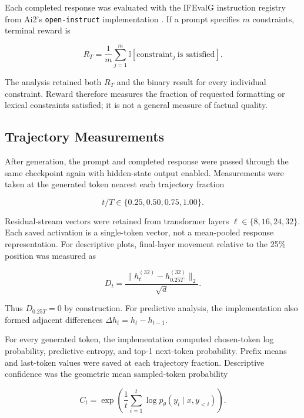 \documentclass[manuscript,screen,nonacm]{acmart}
\begin{document}
Each completed response was evaluated with the IFEvalG instruction registry
from Ai2's \texttt{open-instruct} implementation \citep{openinstruct}. If a
prompt specifies $m$ constraints, terminal reward is

\begin{equation}
R_T=\frac{1}{m}\sum_{j=1}^{m}
\mathbb{I}[\text{constraint}_j\ \text{is satisfied}].
\end{equation}

The analysis retained both $R_T$ and the binary result for every individual
constraint. Reward therefore measures the fraction of requested formatting or
lexical constraints satisfied; it is not a general measure of factual quality.

\subsection{Trajectory Measurements}

After generation, the prompt and completed response were passed through the
same checkpoint again with hidden-state output enabled. Measurements were
taken at the generated token nearest each trajectory fraction

\begin{equation}
t/T\in\{0.25,0.50,0.75,1.00\}.
\end{equation}

Residual-stream vectors were retained from transformer layers
$\ell\in\{8,16,24,32\}$. Each saved activation is a single-token vector, not a
mean-pooled response representation. For descriptive plots, final-layer
movement relative to the 25\% position was measured as

\begin{equation}
D_t=\frac{\lVert h^{(32)}_t-h^{(32)}_{0.25T}\rVert_2}{\sqrt{d}}.
\end{equation}

Thus $D_{0.25T}=0$ by construction. For predictive analysis, the implementation
also formed adjacent differences $\Delta h_t=h_t-h_{t-1}$.

For every generated token, the implementation computed chosen-token log
probability, predictive entropy, and top-1 next-token probability. Prefix means
and last-token values were saved at each trajectory fraction. Descriptive
confidence was the geometric mean sampled-token probability

\begin{equation}
C_t=\exp\left(\frac{1}{t}\sum_{i=1}^{t}
\log p_\theta(y_i\mid x,y_{<i})\right).
\end{equation}
\end{document}
